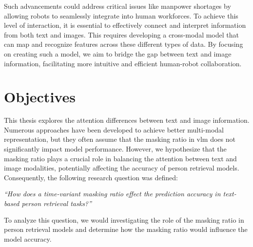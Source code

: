 Such advancements could address critical issues like manpower shortages by allowing robots to seamlessly integrate into human workforces. To achieve this level of interaction, it is essential to effectively connect and interpret information from both text and images. This requires developing a cross-modal model that can map and recognize features across these different types of data. By focusing on creating such a model, we aim to bridge the gap between text and image information, facilitating more intuitive and efficient human-robot collaboration.

\section{Objectives}
This thesis explores the attention differences between text and image information. Numerous approaches have been developed to achieve better multi-modal representation, but they often assume that the masking ratio in \acrshort{vlm} does not significantly impact model performance. However, we hypothesize that the masking ratio plays a crucial role in balancing the attention between text and image modalities, potentially affecting the accuracy of person retrieval models. Consequently, the following research question was defined:

\bigskip
\textit{“How does a time-variant masking ratio effect the prediction accuracy in text-based person retrieval tasks?”}
\bigskip

To analyze this question, we would investigating the role of the masking ratio in person retrieval models and determine how the masking ratio would influence the model accuracy.




